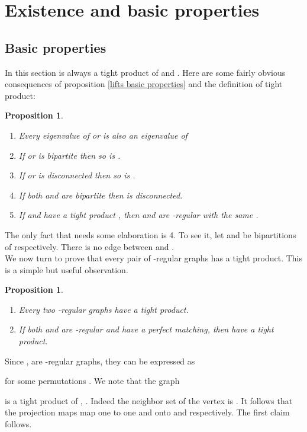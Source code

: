 \documentclass[12pt]{article}
\newtheorem{proposition}[theorem]{Proposition}
\newtheorem{open question}[theorem]{Open question}
\newcommand{\proof}{{\par\noindent {\bf Proof}\space\space}}
\begin{document}
\section{Existence and basic properties}\label{se:existence and basic properties}

 
\subsection{Basic properties}\label{se:basic properties}
In this section  is always a tight product of  and . Here are some fairly obvious
consequences of proposition \ref{lifts basic properties} and the definition of tight product:

\begin{proposition}
\
\begin{enumerate}\label{pro:basic properties}
\item Every eigenvalue of  or  is also an eigenvalue of 
\item If  or  is bipartite then so is .
\item If  or  is disconnected then so is .
\item If both  and  are bipartite then  is disconnected. 
\item If  and  have a tight product , then  and  are -regular with 
the same .
\end{enumerate}
\end{proposition}
The only fact that needs some elaboration is 4. To see it,
let  and   be bipartitions of  respectively. There is no edge
between  and .\\

We now turn to prove that every pair of -regular graphs
has a tight product. This is a simple but useful observation.

\begin{proposition} \label{existence-basic}
\begin{enumerate}
\item Every two -regular graphs have a tight product. \label{2d-existence}
\item If both  and  are -regular and have a perfect matching,
then  have a tight product. \label{2d+1-existence}
\end{enumerate}
\end{proposition}
\proof
Since ,  are -regular graphs, they can be expressed as

for some permutations . We note that the graph

is a tight product of , . Indeed the neighbor set of the vertex
 is .
It follows that the projection maps  map  
one to one and onto  and  respectively. 
The first claim follows.
\end{document}
